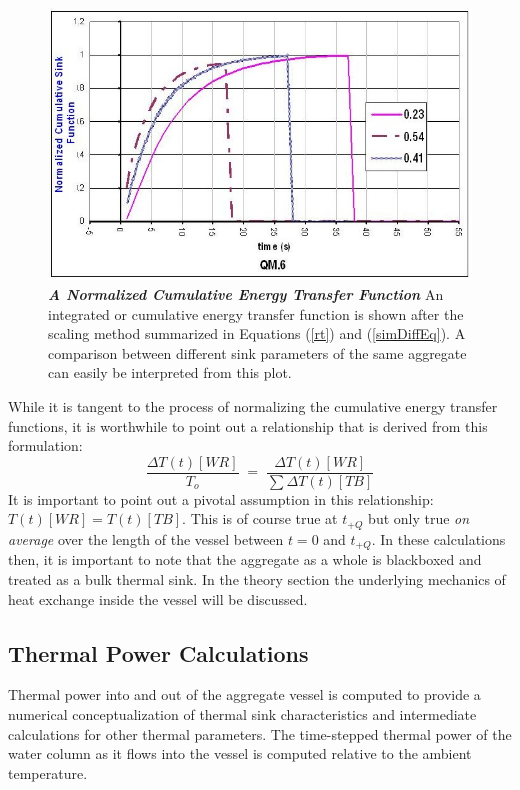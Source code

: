 \begin{figure}[h!]
\begin{center}
\includegraphics[scale=.6]{correctedPlot.jpg}
\caption[Normalized CET Plot]{\textbf{\emph{A Normalized Cumulative Energy Transfer Function}} An integrated or cumulative energy transfer function is shown after the scaling method summarized in Equations (\ref{rt}) and (\ref{simDiffEq}). A comparison between different sink parameters of the same aggregate can easily be interpreted from this plot.\label{corrPlot}}
\end{center}
\end{figure}

While it is tangent to the process of normalizing the cumulative energy transfer functions, it is worthwhile to point out a relationship that is derived from this formulation:
\begin{equation}\label{tt}
\frac{\Delta T(t)[WR]}{T_{o}}\;=\;\frac{\Delta T(t)[WR]}{\sum\Delta T(t)[TB]}
\end{equation}
It is important to point out a pivotal assumption in this relationship: $T(t)[WR]=T(t)[TB]$. This is of course true at $t_{+Q}$ but only true \emph{on average} over the length of the vessel between $t=0$ and $t_{+Q}$. In these calculations then, it is important to note that the aggregate as a whole is blackboxed and treated as a bulk thermal sink. In the theory section the underlying mechanics of heat exchange inside the vessel will be discussed.

\subsection{Thermal Power Calculations}
Thermal power into and out of the aggregate vessel is computed to provide a numerical conceptualization of thermal sink characteristics and intermediate calculations for other thermal parameters. The time-stepped thermal power of the water column as it flows into the vessel is computed relative to the ambient temperature.

